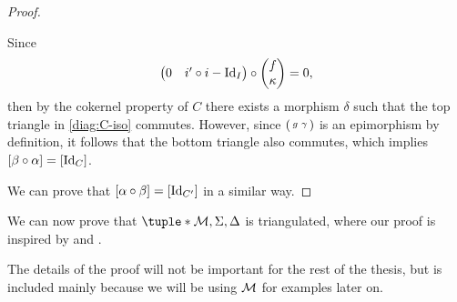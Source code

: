 \begin{proof}
\begin{diagramlabel}[\label{diag:C-iso}]
    \end{diagramlabel}

    Since
    \[
        \begin{pmatrix}
            0 & i' \circ i - \operatorname{Id}_I
        \end{pmatrix}
        \circ
        \begin{pmatrix}
            f \\
            \kappa
        \end{pmatrix}
        = 0,
    \]
    then by the cokernel property of \( C \) there exists a morphism \( \delta \) such that the top triangle in \autoref{diag:C-iso} commutes. However, since \( 
        \begin{psmallmatrix}
            g & \gamma
        \end{psmallmatrix}
    \) is an epimorphism by definition, it follows that the bottom triangle also commutes, which implies \( [\beta \circ \alpha] = [\operatorname{Id}_C] \).

    We can prove that \( [\alpha \circ \beta] = [\operatorname{Id}_{C'}] \) in a similar way.
\end{proof}

We can now prove that \( \tuple*{\Mc, \Sigma, \Delta} \) is triangulated, where our proof is inspired by \cite[p.\ 16]{Happel_1988} and \cite[Theorem 4.18]{Johan_Bachelor}.

The details of the proof will not be important for the rest of the thesis, but is included mainly because we will be using \( {\mathcal{M}} \) for examples later on.


